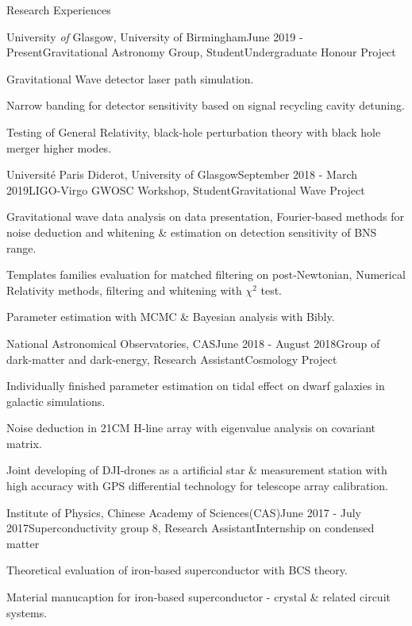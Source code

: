 \documentclass{resume} %
\begin{document}
\begin{rSection}{Research Experiences}

\begin{rSubsection}{University \textit{of} Glasgow, University of Birmingham}{June 2019 - Present}{Gravitational Astronomy Group, Student}{Undergraduate Honour Project}
    \item Gravitational Wave detector laser path simulation.
    \item Narrow banding for detector sensitivity based on signal recycling cavity detuning.
    \item Testing of General Relativity, black-hole perturbation theory with black hole merger higher modes.
    \end{rSubsection}

\begin{rSubsection}{Universit\'{e} Paris Diderot, University of Glasgow}{September 2018 - March 2019}{LIGO-Virgo GWOSC Workshop, Student}{Gravitational Wave Project}
    \item Gravitational wave data analysis on data presentation, Fourier-based methods for noise deduction and whitening
    \& estimation on detection sensitivity of BNS range.
    \item Templates families evaluation for matched filtering on post-Newtonian, Numerical Relativity methods, filtering and whitening with 
    $\chi^2$ test.
    \item Parameter estimation with MCMC \& Bayesian analysis with Bibly.
    \end{rSubsection}

\begin{rSubsection}{National Astronomical Observatories, CAS}{June 2018 - August 2018}{Group of dark-matter and dark-energy, Research Assistant}{Cosmology Project}
    \item Individually finished parameter estimation on tidal effect on dwarf galaxies in galactic simulations.
    \item Noise deduction in 21CM H-line array with eigenvalue analysis on covariant matrix.
    \item Joint developing of DJI-drones as a artificial star \& measurement station with high accuracy with GPS differential technology for telescope array calibration.
    \end{rSubsection}

\begin{rSubsection}{Institute of Physics, Chinese Academy of Sciences(CAS)}{June 2017 - July 2017}{Superconductivity group 8, Research Assistant}{Internship on condensed matter}
\item Theoretical evaluation of iron-based superconductor with BCS theory.
\item Material manucaption for iron-based superconductor - crystal \& related circuit systems.
\end{rSubsection}
\end{rSection}
    
\end{document}
